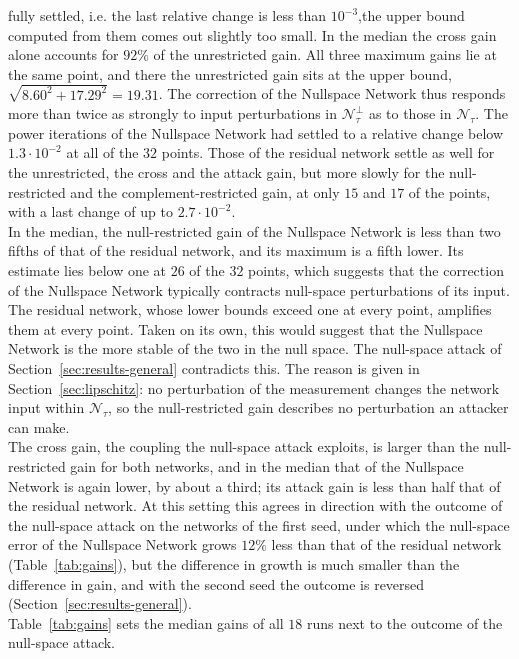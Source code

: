 \documentclass{article}
\numberwithin{equation}{section}
\begin{document}
fully settled, i.e. the last relative change is less than $10^{-3}$,the upper bound computed from them comes out slightly too small. In the median the cross
gain alone accounts for $92\%$ of the unrestricted gain.
All three maximum gains lie at the same point, and there
the unrestricted gain sits at the upper bound, $\sqrt{8.60^2+17.29^2}=19.31$.
The correction of the Nullspace Network thus responds more than
twice as strongly to input perturbations in $\mathcal{N}_\tau^\perp$ as to those in
$\mathcal{N}_\tau$. The power iterations of the Nullspace Network had settled to a relative change below
$1.3\cdot10^{-2}$ at all of the $32$ points. Those of the residual network settle as well for the unrestricted, the
cross and the attack gain, but more slowly for the null-restricted and the complement-restricted gain,
at only $15$ and $17$ of the points, with a last change of up to $2.7\cdot10^{-2}$.\\
In the median, the null-restricted gain of the Nullspace Network is less than two fifths of that of the
residual network, and its maximum is a fifth lower. Its estimate lies below one at $26$ of the $32$
points, which suggests that the correction of the Nullspace Network typically contracts null-space
perturbations of its input. The residual
network, whose lower bounds exceed one at every point, amplifies them at every point. Taken on its own, this would suggest
that the Nullspace Network is the more stable of the two in the null space. The null-space attack
of Section~\ref{sec:results-general} contradicts this. The reason is given in
Section~\ref{sec:lipschitz}: no perturbation of the measurement changes the network input within
$\mathcal{N}_\tau$, so the null-restricted gain describes no perturbation an attacker can make.\\
The cross gain, the coupling the null-space attack exploits, is larger than the null-restricted gain for
both networks, and in the median that of the Nullspace Network is again lower, by about a third; its
attack gain is less than half that of the residual network. At this setting this agrees in direction with
the outcome of the null-space attack on the networks of the first seed, under which the null-space
error of the Nullspace Network grows $12\%$ less than that of the residual network
(Table~\ref{tab:gains}), but the difference in growth is much smaller than the difference in gain, and with
the second seed the outcome is reversed (Section~\ref{sec:results-general}).\\
Table~\ref{tab:gains} sets the median gains of all $18$ runs next to the outcome of the null-space attack.
\end{document}
